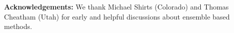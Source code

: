 \documentclass[10pt,letterpaper,draft]{article}
\begin{document}
{\noindent \bf \small Acknowledgements:} We thank Michael Shirts (Colorado) and Thomas Cheatham
(Utah) for early and helpful discussions about ensemble based methods.


\setcounter{page}{1} \pagestyle{plain} 


\end{document}
